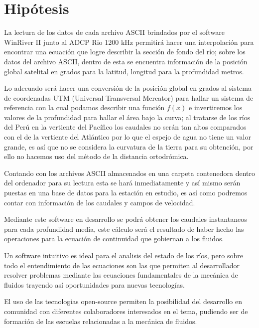 \documentclass[12pt,a4paper]{report}
\begin{document}


\section{Hipótesis}
La lectura de los datos de cada archivo ASCII brindados por el software WinRiver II junto al ADCP Rio 1200 kHz permitirá hacer una interpolación para encontrar una ecuación que logre describir la sección de fondo del río; sobre los datos del archivo ASCII, dentro de esta se encuentra información de la posición global satelital en grados para la latitud, longitud para la profundidad metros.

Lo adecuado será hacer una conversión de la posición global en grados al sistema de coordenadas UTM (Universal Transversal Mercator) para hallar un sistema de referencia con la cual podamos describir una función $ f(x) $ e invertiremos los valores de la profundidad para hallar el área bajo la curva; al tratarse de los ríos del Perú en la vertiente del Pacífico los caudales no serán tan altos comparados con el de la vertiente del Atlántico por lo que el espejo de agua no tiene un valor grande, es así que no se considera la curvatura de la tierra para su obtención, por ello no hacemos uso del método de la distancia ortodrómica.

Contando con los archivos ASCII almacenados en una carpeta contenedora dentro del ordenador para su lectura esta se hará inmediatamente y así mismo serán puestas en una base de datos para la estación en estudio, es así como podremos contar con información de los caudales y campos de velocidad.

Mediante este software en desarrollo se podrá obtener los caudales instantaneos para cada profundidad media, este cálculo será el resultado de haber hecho las operaciones para la ecuación de continuidad que gobiernan a los fluidos.

Un software intuitivo es ideal para el analisis del estado de los ríos, pero sobre todo el entendimiento de las ecuaciones son las que permiten al desarrollador resolver problemas mediante las ecuaciones fundamentales de la mecánica de fluidos trayendo así oportunidades para nuevas tecnologías.

El uso de las tecnologias open-source permiten la posibilidad del desarrollo en comunidad con diferentes colaboradores interesados en el tema, pudiendo ser de formación de las escuelas relacionadas a la mecánica de fluidos.
\end{document}
